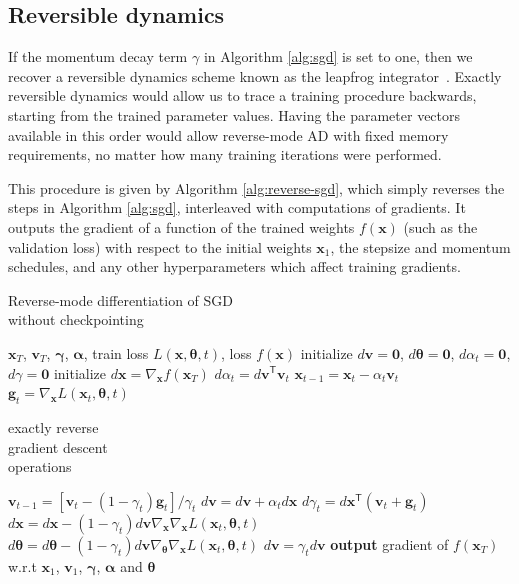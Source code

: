 \documentclass{article}
\newcommand{\vx}{\mathbf{x}}
\newcommand{\vv}{\mathbf{v}}
\newcommand{\vg}{\mathbf{g}}
\newcommand{\vzero}{\mathbf{0}}
\newcommand{\tra}{^{\mathsf{T}}}
\newcommand{\hypers}{{\boldsymbol{\theta}}}
\newcommand{\params}{\vx}
\newcommand{\decay}{\gamma}
\newcommand{\decays}{{\boldsymbol{\decay}}}
\newcommand{\stepsize}{\alpha}
\newcommand{\stepsizes}{{\boldsymbol{\stepsize}}}
\newcommand{\gradparams}{\nabla_\params L(\params_t, \hypers, t)}
\begin{document}
\subsection{Reversible dynamics}

If the momentum decay term $\decay$ in Algorithm \ref{alg:sgd} is set to one, then we recover a reversible dynamics scheme known as the leapfrog integrator~\citep{leapfrog1995}.
Exactly reversible dynamics would allow us to trace a training procedure backwards, starting from the trained parameter values.
Having the parameter vectors available in this order would allow reverse-mode AD with fixed memory requirements, no matter how many training iterations were performed.

This procedure is given by Algorithm \ref{alg:reverse-sgd}, which simply reverses the steps in Algorithm \ref{alg:sgd}, interleaved with computations of gradients.
It outputs the gradient of a function of the trained weights $f(\vx)$ (such as the validation loss) with respect to the initial weights $\vx_1$, the stepsize and momentum schedules, and any other hyperparameters which affect training gradients.
%
\begin{algorithm}
   \caption{Reverse-mode differentiation of SGD \\ without checkpointing}
   \label{alg:reverse-sgd}
\begin{algorithmic}[1]
    $\vx_T$, $\vv_T$, $\decays$, $\stepsizes$, train loss $L(\params, \hypers, t)$, loss $f(\params)$
   \State initialize $d\vv = \vzero$, $d\hypers = \vzero$, $d\stepsize_t = \vzero$, $d\decay = \vzero$
   \State initialize $d\vx = \nabla_\params f(\params_T)$
   \State $d\stepsize_t = d\vv\tra \vv_t$
   \State $\vx_{t-1} = \vx_t - \stepsize_t \vv_t$ \label{step:reverse-position}
   \vspace{-0.95\baselineskip}
   \State $\vg_t = \gradparams$ \label{step:reverse-gradient}
   \hfill \scalebox{1.1}{\Bigg\}} \vspace{-\baselineskip} \begin{minipage}{2.5cm} exactly reverse \\ gradient descent \\ operations \strut \end{minipage}
   \State $\vv_{t-1} = [\vv_t - (1 - \decay_t) \vg_t] / \decay_t$ \label{step:reverse-velocity}
   \State $d\vv = d\vv + \stepsize_t d\vx$
   \State $d\decay_t = d\vx\tra (\vv_t + \vg_t)$
   \State $d\vx = d\vx - (1 - \decay_t) d\vv \nabla_\params \gradparams$ \label{line:hvp1}
   \State $d\hypers = d\hypers - (1 - \decay_t) d\vv \nabla_\hypers \gradparams$ \label{line:hvp2}
   \State $d\vv = \decay_t d\vv$
   \EndFor
   \State \textbf{output} gradient of $f(\vx_T)$ w.r.t $\vx_1$, $\vv_1$, $\decays$, $\stepsizes$ and $\hypers$
\end{algorithmic}
\end{algorithm}
%
\end{document}
